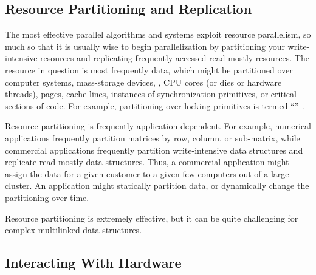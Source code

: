 \QuickQuizEnd

\subsection{Resource Partitioning and Replication}
\label{sec:Resource Partitioning and Replication}

The most effective parallel algorithms and systems exploit resource
parallelism, so much so that it is
usually wise to begin parallelization by partitioning your write-intensive
resources and replicating frequently accessed read-mostly resources.
The resource in question is most frequently data, which might be
partitioned over computer systems, mass-storage devices, ,
CPU cores (or dies or hardware threads), pages, cache lines, instances
of synchronization primitives, or critical sections of code.
For example, partitioning over locking primitives is termed
``''~\cite{Beck85}.

Resource partitioning is frequently application dependent.
For example, numerical applications frequently partition matrices
by row, column, or sub-matrix, while commercial applications frequently
partition write-intensive data structures and replicate
read-mostly data structures.
Thus, a commercial application might assign the data for a
given customer to a given few computers out of a large cluster.
An application might statically partition data, or dynamically
change the partitioning over time.

Resource partitioning is extremely effective, but
it can be quite challenging for complex multilinked data
structures.

\subsection{Interacting With Hardware}
\label{sec:Interacting With Hardware}

